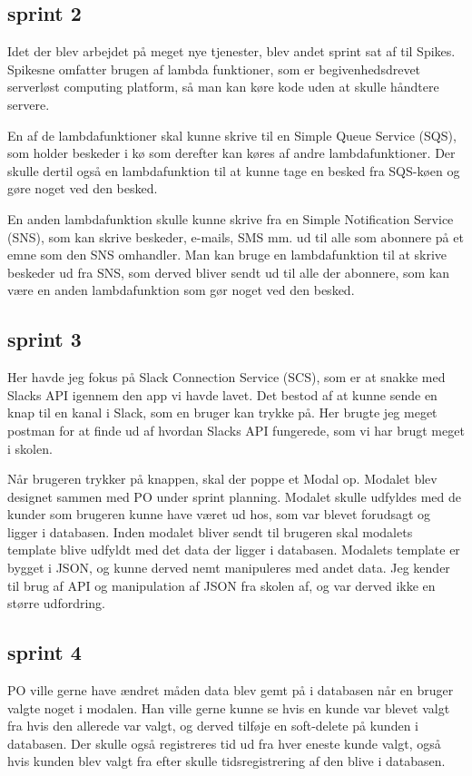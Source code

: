 \documentclass[11pt]{report}
\begin{document}
\subsection*{sprint 2}
Idet der blev arbejdet på meget nye tjenester, blev andet sprint sat af til Spikes. 
Spikesne omfatter brugen af lambda funktioner, som er begivenhedsdrevet serverløst computing platform, 
så man kan køre kode uden at skulle håndtere servere.

En af de lambdafunktioner skal kunne skrive til en Simple Queue Service (SQS), som holder beskeder i kø som 
derefter kan køres af andre lambdafunktioner. Der skulle dertil også en lambdafunktion til at kunne tage en 
besked fra SQS-køen og gøre noget ved den besked.

En anden lambdafunktion skulle kunne skrive fra en Simple Notification Service (SNS), som kan skrive beskeder, 
e-mails, SMS mm. ud til alle som abonnere på et emne som den SNS omhandler. Man kan bruge en lambdafunktion til 
at skrive beskeder ud fra SNS, som derved bliver sendt ud til alle der abonnere, som kan være en anden 
lambdafunktion som gør noget ved den besked. 

\subsection*{sprint 3}
Her havde jeg fokus på Slack Connection Service (SCS), som er at snakke med Slacks API igennem den app vi havde lavet. 
Det bestod af at kunne sende en knap til en kanal i Slack, som en bruger kan trykke på. Her brugte jeg meget postman 
for at finde ud af hvordan Slacks API fungerede, som vi har brugt meget i skolen. 

Når brugeren trykker på knappen, skal der poppe et Modal op. Modalet blev designet sammen med PO under sprint planning. 
Modalet skulle udfyldes med de kunder som brugeren kunne have været ud hos, som var blevet forudsagt og ligger i 
databasen. Inden modalet bliver sendt til brugeren skal modalets template blive udfyldt med det data der ligger i 
databasen. Modalets template er bygget i JSON, og kunne derved nemt manipuleres med andet data. Jeg kender til brug 
af API og manipulation af JSON fra skolen af, og var derved ikke en større udfordring. 

\subsection*{sprint 4}
PO ville gerne have ændret måden data blev gemt på i databasen når en bruger valgte noget i modalen. 
Han ville gerne kunne se hvis en kunde var blevet valgt fra hvis den allerede var valgt, og derved tilføje en 
soft-delete på kunden i databasen. Der skulle også registreres tid ud fra hver eneste kunde valgt, også hvis kunden blev 
valgt fra efter skulle tidsregistrering af den blive i databasen. 
\end{document}
